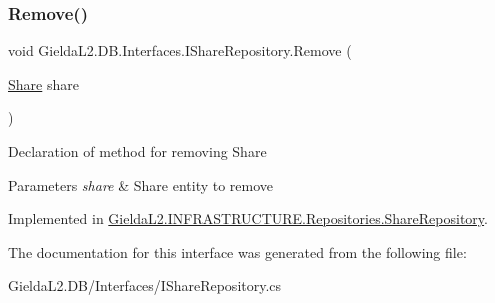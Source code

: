 \subsubsection{\texorpdfstring{Remove()}{Remove()}}
{\footnotesize\ttfamily void Gielda\+L2.\+D\+B.\+Interfaces.\+I\+Share\+Repository.\+Remove (\begin{DoxyParamCaption}\item[{\mbox{\hyperlink{class_gielda_l2_1_1_d_b_1_1_entities_1_1_share}{Share}}}]{share }\end{DoxyParamCaption})}



Declaration of method for removing Share 


\begin{DoxyParams}{Parameters}
{\em share} & Share entity to remove\\
\hline
\end{DoxyParams}


Implemented in \mbox{\hyperlink{class_gielda_l2_1_1_i_n_f_r_a_s_t_r_u_c_t_u_r_e_1_1_repositories_1_1_share_repository_a76ee0cf8f78b19983167a3bcdff4e405}{Gielda\+L2.\+I\+N\+F\+R\+A\+S\+T\+R\+U\+C\+T\+U\+R\+E.\+Repositories.\+Share\+Repository}}.



The documentation for this interface was generated from the following file\+:\begin{DoxyCompactItemize}
\item 
Gielda\+L2.\+D\+B/\+Interfaces/I\+Share\+Repository.\+cs\end{DoxyCompactItemize}
